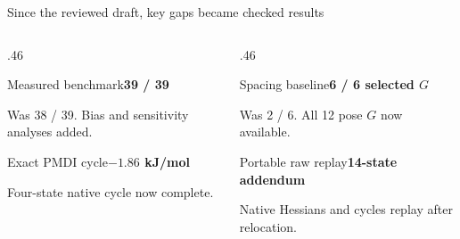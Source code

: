 \begin{frame}{Since the reviewed draft, key gaps became checked results}
\begin{columns}[T]
\begin{column}{.46\textwidth}
\begin{block}{Measured benchmark}{\LARGE\bfseries39 / 39}\par\small Was 38 / 39. Bias and sensitivity analyses added.\end{block}
\begin{block}{Exact PMDI cycle}{\LARGE\bfseries$-1.86$ kJ/mol}\par\small Four-state native cycle now complete.\end{block}
\end{column}
\begin{column}{.46\textwidth}
\begin{block}{Spacing baseline}{\LARGE\bfseries6 / 6 selected $G$}\par\small Was 2 / 6. All 12 pose $G$ now available.\end{block}
\begin{block}{Portable raw replay}{\LARGE\bfseries14-state addendum}\par\small Native Hessians and cycles replay after relocation.\end{block}
\end{column}\end{columns}
\end{frame}

